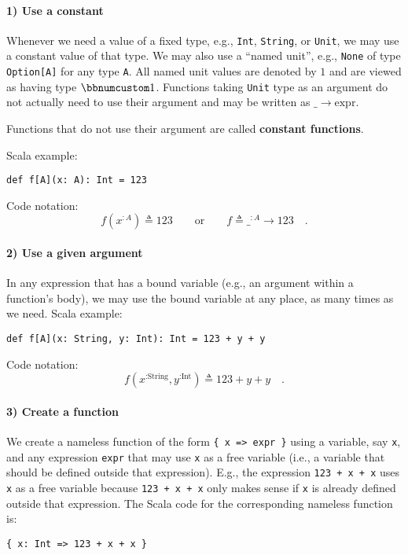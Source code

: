 \paragraph{1) Use a constant}

Whenever we need a value of a fixed type, e.g., \lstinline!Int!,
\lstinline!String!, or \lstinline!Unit!, we may use a constant value
of that type. We may also use a \textsf{``}named unit\textsf{''},
e.g., \lstinline!None! of type \lstinline!Option[A]! for any type
\lstinline!A!. All named unit values are denoted by $1$ and are
viewed as having type $\bbnum 1$. Functions taking \lstinline!Unit!
type as an argument do not actually need to use their argument and
may be written as $\_\rightarrow\text{expr}$.

Functions that do not use their argument are called \textbf{constant
functions}.

Scala example:
\begin{lstlisting}
def f[A](x: A): Int = 123
\end{lstlisting}
Code notation:
\[
f(x^{:A})\triangleq123\quad\quad\text{or}\quad\quad f\triangleq\_^{:A}\rightarrow123\quad.
\]


\paragraph{2) Use a given argument}

In any expression that has a bound variable
(e.g., an argument within a function\textsf{'}s body), we may use the bound
variable at any place, as many times as we need. Scala example:
\begin{lstlisting}
def f[A](x: String, y: Int): Int = 123 + y + y
\end{lstlisting}
Code notation:
\[
f(x^{:\text{String}},y^{:\text{Int}})\triangleq123+y+y\quad.
\]


\paragraph{3) Create a function}

We create a nameless function of the form \lstinline!{ x => expr }!
using a variable, say \lstinline!x!, and any expression \lstinline!expr!
that may use \lstinline!x! as a free variable
(i.e., a variable that should be defined outside that expression).
E.g., the expression \lstinline!123 + x + x! uses \lstinline!x!
as a free variable because \lstinline!123 + x + x! only makes sense
if \lstinline!x! is already defined outside that expression. The
Scala code for the corresponding nameless function is:
\begin{lstlisting}
{ x: Int => 123 + x + x }
\end{lstlisting}

